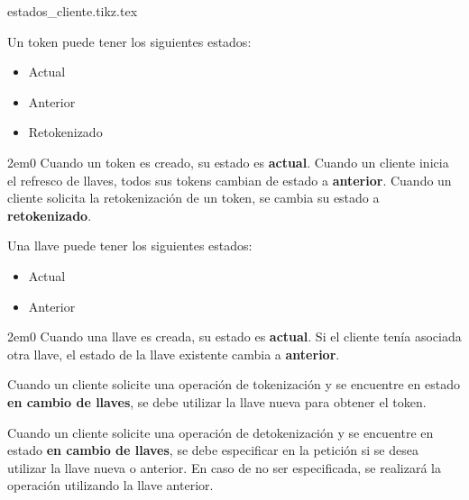 \begin{sidewaysfigure}
  \begin{center}
    {estados_cliente.tikz.tex}
    \caption{Diagrama de estados de un cliente.}
    \label{estados_cliente}
  \end{center}
\end{sidewaysfigure}

{
  Un token puede tener los siguientes estados:
  \begin{itemize}
    \item Actual
    \item Anterior
    \item Retokenizado
  \end{itemize}

  \begin{hangparas}{2em}{0}
    Cuando un token es creado, su estado es \textbf{actual}.
    Cuando un cliente inicia el refresco de llaves, todos sus tokens cambian de
    estado a \textbf{anterior}.
    Cuando un cliente solicita la retokenización de un token, se cambia su estado
    a \textbf{retokenizado}.
  \end{hangparas}
}

{
  Una llave puede tener los siguientes estados:
  \begin{itemize}
    \item Actual
    \item Anterior
  \end{itemize}

  \begin{hangparas}{2em}{0}
    Cuando una llave es creada, su estado es \textbf{actual}. Si el cliente
    tenía asociada otra llave, el estado de la llave existente cambia a
    \textbf{anterior}.
  \end{hangparas}
}

{
  Cuando un cliente solicite una operación de tokenización y se encuentre en
  estado \textbf{en cambio de llaves}, se debe utilizar la llave nueva para
  obtener el token.
}

{
  Cuando un cliente solicite una operación de detokenización y se encuentre en
  estado \textbf{en cambio de llaves}, se debe especificar en la petición si
  se desea utilizar la llave nueva o anterior. En caso de no ser especificada,
  se realizará la operación utilizando la llave anterior.
}

